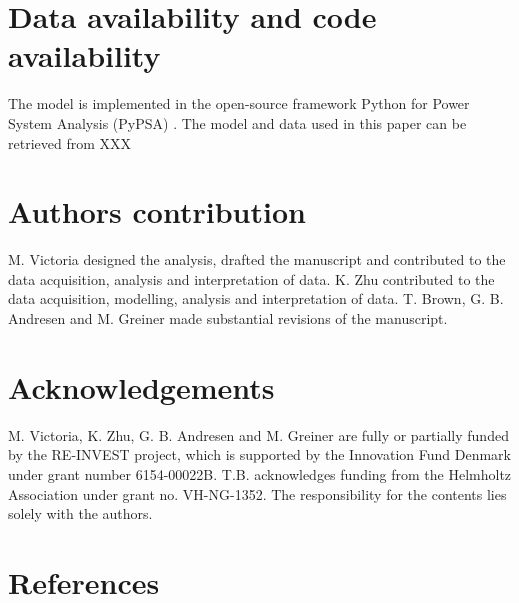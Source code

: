 \documentclass[5p]{elsarticle} %
\begin{document}
\FloatBarrier

\section{Data availability and code availability}

The model is implemented in the open-source framework Python for Power System Analysis (PyPSA) \cite{PyPSA}. The model and data used in this paper can be retrieved from \textcolor[rgb]{1,0,0}{XXX}

\section{Authors contribution}

M. Victoria designed the analysis, drafted the manuscript and contributed to the data acquisition, analysis and interpretation of data. K. Zhu contributed to the data acquisition, modelling, analysis and interpretation of data. 
T. Brown, G. B. Andresen and M. Greiner made substantial revisions of the manuscript. 

\section{Acknowledgements}
M. Victoria, K. Zhu, G. B. Andresen and M. Greiner are fully or partially funded by the RE-INVEST project, which is supported by  the  Innovation  Fund  Denmark  under  grant  number  6154-00022B. T.B. acknowledges funding from the Helmholtz Association under grant no. VH-NG-1352. The responsibility for the contents lies solely with the authors.

\section{References}

\end{document}
